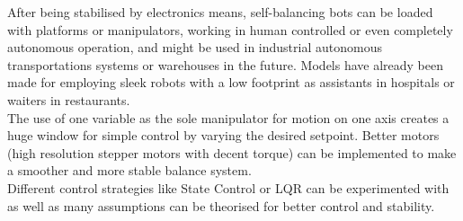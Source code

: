 After being stabilised by electronics means, self-balancing bots can be loaded with platforms or manipulators, working in human controlled or even completely autonomous operation, and might be used in industrial autonomous transportations systems or warehouses in the future. Models have already been made for employing sleek robots with a low footprint as assistants in hospitals or waiters in restaurants.\\

The use of one variable as the sole manipulator for motion on one axis creates a huge window for simple control by varying the desired setpoint. Better motors (high resolution stepper motors with decent torque) can be implemented to make a smoother and more stable balance system.\\

Different control strategies like State Control or LQR can be experimented with as well as many assumptions can be theorised for better control and stability.
